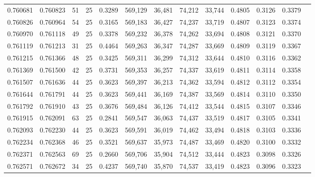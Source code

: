 \begin{tabular}{rrrrrrrrrrrrr}
0.760681 & 0.760823 &    51 &  25 &                                     0.3289 & 569,129 &  36,481 &  74,212 &  33,744 & 0.4805 & 0.3126 & 0.3379 \\
0.760826 & 0.760964 &    54 &  25 &                                     0.3165 & 569,183 &  36,427 &  74,237 &  33,719 & 0.4807 & 0.3123 & 0.3374 \\
0.760970 & 0.761118 &    49 &  25 &                                     0.3378 & 569,232 &  36,378 &  74,262 &  33,694 & 0.4808 & 0.3121 & 0.3370 \\
0.761119 & 0.761213 &    31 &  25 &                                     0.4464 & 569,263 &  36,347 &  74,287 &  33,669 & 0.4809 & 0.3119 & 0.3367 \\
0.761215 & 0.761366 &    48 &  25 &                                     0.3425 & 569,311 &  36,299 &  74,312 &  33,644 & 0.4810 & 0.3116 & 0.3362 \\
0.761369 & 0.761500 &    42 &  25 &                                     0.3731 & 569,353 &  36,257 &  74,337 &  33,619 & 0.4811 & 0.3114 & 0.3358 \\
0.761507 & 0.761636 &    44 &  25 &                                     0.3623 & 569,397 &  36,213 &  74,362 &  33,594 & 0.4812 & 0.3112 & 0.3354 \\
0.761644 & 0.761791 &    44 &  25 &                                     0.3623 & 569,441 &  36,169 &  74,387 &  33,569 & 0.4814 & 0.3110 & 0.3350 \\
0.761792 & 0.761910 &    43 &  25 &                                     0.3676 & 569,484 &  36,126 &  74,412 &  33,544 & 0.4815 & 0.3107 & 0.3346 \\
0.761915 & 0.762091 &    63 &  25 &                                     0.2841 & 569,547 &  36,063 &  74,437 &  33,519 & 0.4817 & 0.3105 & 0.3341 \\
0.762093 & 0.762230 &    44 &  25 &                                     0.3623 & 569,591 &  36,019 &  74,462 &  33,494 & 0.4818 & 0.3103 & 0.3336 \\
0.762234 & 0.762368 &    46 &  25 &                                     0.3521 & 569,637 &  35,973 &  74,487 &  33,469 & 0.4820 & 0.3100 & 0.3332 \\
0.762371 & 0.762563 &    69 &  25 &                                     0.2660 & 569,706 &  35,904 &  74,512 &  33,444 & 0.4823 & 0.3098 & 0.3326 \\
0.762571 & 0.762672 &    34 &  25 &                                     0.4237 & 569,740 &  35,870 &  74,537 &  33,419 & 0.4823 & 0.3096 & 0.3323 \\

\end{tabular}
